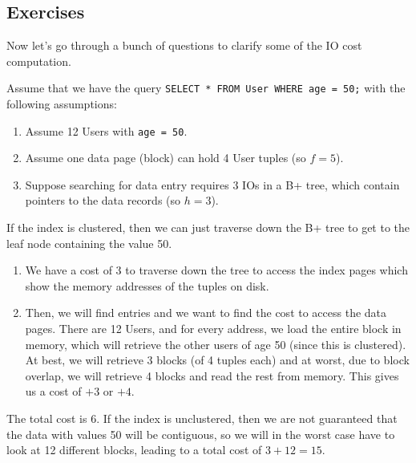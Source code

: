 \subsection{Exercises}

  Now let's go through a bunch of questions to clarify some of the IO cost computation. 

  \begin{example}
    Assume that we have the query \texttt{SELECT * FROM User WHERE age = 50;} with the following assumptions: 
    \begin{enumerate}
      \item Assume 12 Users with \texttt{age = 50}. 
      \item Assume one data page (block) can hold 4 User tuples (so $f = 5$). 
      \item Suppose searching for data entry requires 3 IOs in a B+ tree, which contain pointers to the data records (so $h = 3$). 
    \end{enumerate}

    If the index is clustered, then we can just traverse down the B+ tree to get to the leaf node containing the value 50. 
    \begin{enumerate}
      \item We have a cost of 3 to traverse down the tree to access the index pages which show the memory addresses of the tuples on disk. 

      \item Then, we will find entries and we want to find the cost to access the data pages. There are 12 Users, and for every address, we load the entire block in memory, which will retrieve the other users of age 50 (since this is clustered). At best, we will retrieve 3 blocks (of 4 tuples each) and at worst, due to block overlap, we will retrieve 4 blocks and read the rest from memory. This gives us a cost of $+3$ or $+4$. 
    \end{enumerate}
    The total cost is 6. If the index is unclustered, then we are not guaranteed that the data with values 50 will be contiguous, so we will in the worst case have to look at 12 different blocks, leading to a total cost of $3 + 12 = 15$. 
  \end{example}

